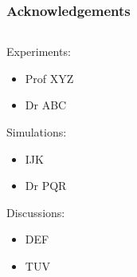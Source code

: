\documentclass[xcolor=dvipsnames, aspectratio=1610]{beamer}
\begin{document}
\begin{frame}
\frametitle{Acknowledgements}

\begin{columns}

   \begin{column}{0.3\textwidth}
   \footnotesize{
   
   {\large{\color{RoyalPurple} Experiments:}}
   
   \begin{itemize}
   
      \item Prof XYZ
      
      \item Dr ABC
   
   \end{itemize}
   
   {\large{\color{RoyalPurple} Simulations:}}
   
   \begin{itemize}
   
      \item IJK\footnotemark[1]
   
      \item Dr PQR\footnotemark[2]
   
   \end{itemize}
   
   {\large{\color{RoyalPurple} Discussions:}}
   
   \begin{itemize}
   
      \item DEF
      
      \item TUV
   
   \end{itemize}
   }
   \end{column}
   
   \begin{column}{0.5\textwidth}
   \end{column}

\end{columns}


\vspace{1 em}
\begin{columns}


   \begin{column}{0.08\textwidth}
   \end{column}
   

\end{columns}
\end{frame}
\end{document}
